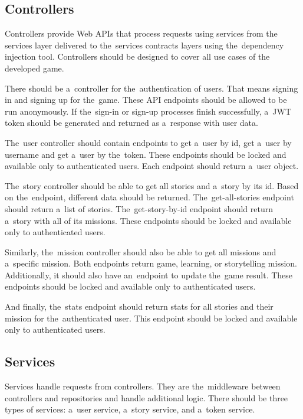 \subsection{Controllers}

Controllers provide Web APIs that process requests using services from the services layer delivered to the~services contracts layers using the~dependency injection tool.
Controllers should be designed to cover all use cases of the developed game.

There should be a~controller for the~authentication of users.
That means signing in and signing up for the~game.
These API endpoints should be allowed to be run anonymously.
If the~sign-in or sign-up processes finish successfully, a~JWT token should be generated and returned as a~response with user data.

The~user controller should contain endpoints to get a~user by id, get a~user by username and get a~user by the~token.
These endpoints should be locked and available only to authenticated users.
Each endpoint should return a~user object.

The~story controller should be able to get all stories and a~story by its id.
Based on the~endpoint, different data should be returned.
The~get-all-stories endpoint should return a~list of stories.
The~get-story-by-id endpoint should return a~story with all of its missions.
These endpoints should be locked and available only to authenticated users.

Similarly, the~mission controller should also be able to get all missions and a~specific mission.
Both endpoints return game, learning, or storytelling mission.
Additionally, it should also have an~endpoint to update the~game result.
These endpoints should be locked and available only to authenticated users.

\pagebreak

And finally, the~stats endpoint should return stats for all stories and their mission for the~authenticated user.
This endpoint should be locked and available only to authenticated users.

\subsection{Services}

Services handle requests from controllers.
They are the~middleware between controllers and repositories and handle additional logic.
There should be three types of services: a~user service, a~story service, and a~token service.

